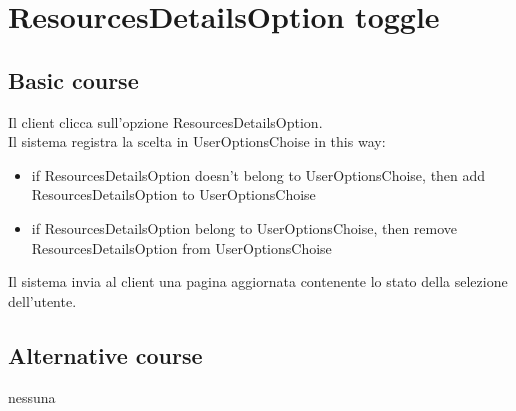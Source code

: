 \section{ResourcesDetailsOption toggle}
\label{seq:ResourcesDetailsOption_toggle}
\subsection{Basic course}
Il client clicca sull'opzione ResourcesDetailsOption. \\
Il sistema registra la scelta in UserOptionsChoise in this way:
\begin{itemize}
  \item if ResourcesDetailsOption doesn't belong to UserOptionsChoise, then add
  ResourcesDetailsOption to UserOptionsChoise
  \item if ResourcesDetailsOption belong to UserOptionsChoise, then remove
  ResourcesDetailsOption from UserOptionsChoise 
\end{itemize}
Il sistema invia al client una pagina aggiornata contenente lo stato della
selezione dell'utente.

\subsection{Alternative course}
\begin{description}
\item[nessuna]
\end{description}